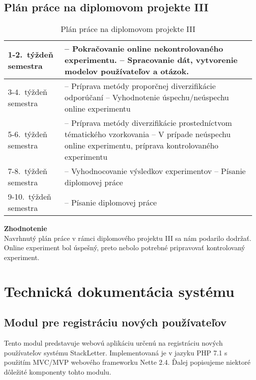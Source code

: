 \newpage
\section{Plán práce na diplomovom projekte III}\label{apx:dp3plan}

\begin{table}[h]
\centering
\caption{Plán práce na diplomovom projekte III}
\begin{tabular}{|m{2.3cm}|m{12cm}|}
\hline
1-2.~týždeň semestra & -- Pokračovanie online nekontrolovaného experimentu.
			  \newline -- Spracovanie dát, vytvorenie modelov používateľov a otázok. \\ \hline
3-4.~týždeň semestra & -- Príprava metódy proporčnej diverzifikácie odporúčaní
			  \newline -- Vyhodnotenie úspechu/neúspechu online experimentu \\ \hline
5-6.~týždeň semestra & -- Príprava metódy diverzifikácie prostedníctvom tématického vzorkovania
              \newline -- V prípade neúspechu online experimentu, príprava kontrolovaného experimentu \\ \hline
7-8.~týždeň semestra & -- Vyhodnocovanie výsledkov experimentov
			  \newline -- Písanie diplomovej práce \\ \hline
9-10.~týždeň semestra & -- Písanie diplomovej práce \\ \hline
\end{tabular}
\end{table}

\textbf{Zhodnotenie}\\
Navrhnutý plán práce v rámci diplomového projektu III sa nám podarilo dodržať. Online experiment bol úspešný, preto nebolo
potrebné pripravovať kontrolovaný experiment.

\afterpage{\blankpage}
\newpage
\chapter{Technická dokumentácia systému}\label{tech-doc}

\section{Modul pre registráciu nových používateľov}

Tento modul predstavuje webovú aplikáciu určenú na registráciu nových používateľov systému StackLetter. Implementovaná je
v jazyku PHP 7.1 s použitím MVC/MVP webového frameworku Nette 2.4. Ďalej popisujeme niektoré dôležité komponenty tohto modulu.

